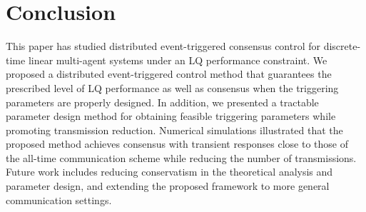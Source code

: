 \documentclass[letterpaper,10pt,conference]{ieeeconf}
\begin{document}
\section{Conclusion}
\label{sec:conclusion}

This paper has studied distributed event-triggered consensus control for discrete-time linear multi-agent systems under an LQ performance constraint.
We proposed a distributed event-triggered control method that guarantees the prescribed level of LQ performance as well as consensus when the triggering parameters are properly designed.
In addition, we presented a tractable parameter design method for obtaining feasible triggering parameters while promoting transmission reduction.
Numerical simulations illustrated that the proposed method achieves consensus with transient responses close to those of the all-time communication scheme while reducing the number of transmissions.
Future work includes reducing conservatism in the theoretical analysis and parameter design, and extending the proposed framework to more general communication settings.

\balance


\end{document}
